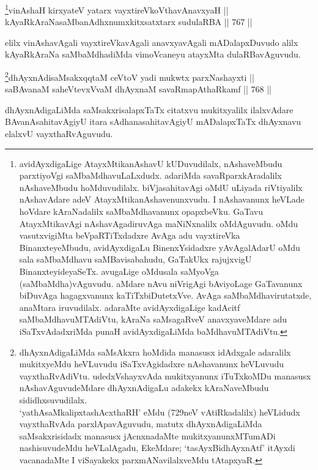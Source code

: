 \begin{shl}
\footnote{avidAyxdigaLige AtayxMtikanAshavU kUDuvudilalx, nAshaveMbudu parxtiyoVgi saMbaMdhavuLaLxdudx. adariMda savaRparxkAradalilx nAshaveMbudu hoMduvudilalx. biVjasahitavAgi oMdU uLiyada riVtiyalilx nAshavAdare adeV AtayxMtikanAshavenunxvudu. I nAshavanunx heVLade hoVdare kAraNadalilx saMbaMdhavanunx opapxbeVku. GaTavu AtayxMtikavAgi nAshavAgadiruvAga maNiNxnalilx oMdAguvudu. oMdu vasutxvigiMta beVpaRTiTxdadxre AvAga adu vayxtireVka BinanxteyeMbudu, avidAyxdigaLu BinenxYsidadxre yAvAgalAdarU oMdu sala saMbaMdhavu saMBavisabahudu, GaTakUkx rajujxvigU BinanxteyideyaSeTx. avugaLige oMdusala saMyoVga (saMbaMdha)vAguvudu. aMdare nAvu niVrigAgi bAviyoLage GaTavanunx biDuvAga hagagxvanunx kaTiTxbiDutetxVve. AvAga saMbaMdhavirutatxde, anaMtara iruvudilalx. adaraMte avidAyxdigaLige kadAcitf saMbaMdhavuMTAdiVtu, kAraNa saMsagaRveV anavxyaveMdare adu iSaTxvAdadxriMda punaH avidAyxdigaLiMda baMdhavuMTAdiVtu.}vinAshaH kirxyateV yatarx vayxtireVkoV\s thavA\s navxyaH ||  \\
kAyaRkAraNasaMbanAdhxnumxkitxsatxtarx sudulaRBA \hfill || 767 ||  
\end{shl}

\begin{artha} 
elilx vinAshavAgali vayxtireVkavAgali anavxyavAgali mADalapxDuvudo alilx kAyaRkAraNa saMbaMdhadiMda vimoVcaneyu atayxMta dulaRBavAguvudu.
\end{artha}



\begin{shl}
\footnote{dhAyxnAdigaLiMda saMsAkxra hoMdida manasusx idAdxgale adaralilx mukitxyeMdu heVLuvudu iSaTxvAgidadxre nAshavanunx heVLuvudu vayxthaRvAdiVtu. udedxVshayxvAda mukitxyanunx iTuTxkoMDu manasusx nAshavAguvudeMdare dhAyxnAdigaLu adakekx kAraNaveMbudu sididhxsuvudilalx.\\
`yathAsaMkalipxtashAcxthaRH' eMdu (729neV vAtiRkadalilx) heVLidudx vayxthaRvAda parxlApavAguvudu, matutx dhAyxnAdigaLiMda saMsakxrisidadx manasusx jAcnxnadaMte mukitxyanunxMTumADi nashisuvudeMdu heVLalAgadu, EkeMdare; `tasAyxBidhAyxnAtf' itAyxdi vacanadaMte I viSayakekx parxmANavilalxveMdu tAtapxyaR.}dhAyxnAdisaMsakxqqtaM ceVtoV yadi mukwtx parxNashayxti || \\
saBAvanaM saheVtevxVvaM dhAyxnaM savaRmapAthaRkamf \hfill || 768 ||  
\end{shl}

\begin{artha} 
dhAyxnAdigaLiMda saMsakxrisalapxTaTx citatxvu mukitxyalilx ilalxvAdare 
BAvanAsahitavAgiyU itara sAdhanasahitavAgiyU mADalapxTaTx dhAyxnavu 
elalxvU vayxthaRvAguvudu.
\end{artha}

